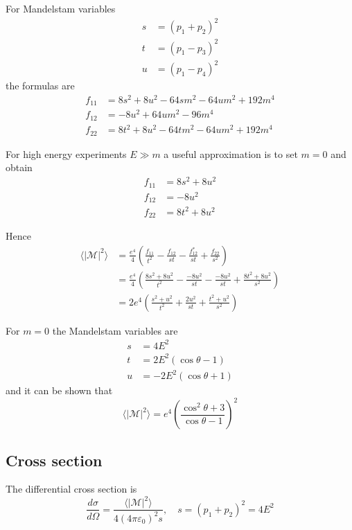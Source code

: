 \documentclass[12pt]{article}
\begin{document}
For Mandelstam variables
\begin{align*}
s&=(p_1+p_2)^2
\\
t&=(p_1-p_3)^2
\\
u&=(p_1-p_4)^2
\end{align*}
the formulas are
\begin{align*}
f_{11} &= 8 s^2 + 8 u^2 - 64 s m^2 - 64 u m^2 + 192 m^4
\\
f_{12} &= -8 u^2 + 64 u m^2 - 96 m^4
\\
f_{22} &= 8 t^2 + 8 u^2 - 64 t m^2 - 64 u m^2 + 192 m^4
\end{align*}

For high energy experiments $E\gg m$ a useful approximation is to set $m=0$ and obtain
\begin{align*}
f_{11}&= 8 s^2 + 8 u^2\\
f_{12}&= -8 u^2\\
f_{22}&= 8 t^2 + 8 u^2
\end{align*}

Hence
\begin{align*}
\langle|\mathcal{M}|^2\rangle
&=\frac{e^4}{4}
\left(
\frac{f_{11}}{t^2} - \frac{f_{12}}{st} -
\frac{f_{12}^*}{st} + \frac{f_{22}}{s^2}
\right)
\\
&=\frac{e^4}{4}
\left(
\frac{8s^2+8u^2}{t^2} - \frac{-8u^2}{st} - \frac{-8u^2}{st} + \frac{8t^2+8u^2}{s^2}
\right)
\\
&=2e^4
\left(
\frac{s^2+u^2}{t^2} + \frac{2u^2}{st} + \frac{t^2+u^2}{s^2}
\right)
\end{align*}

For $m=0$ the Mandelstam variables are
\begin{align*}
s&=4E^2
\\
t&=2E^2(\cos\theta-1)
\\
u&=-2E^2(\cos\theta+1)
\end{align*}
and it can be shown that
\begin{equation*}
\langle|\mathcal{M}|^2\rangle
=e^4
\left(
\frac{\cos^2\theta+3}{\cos\theta-1}
\right)^2
\end{equation*}

\subsection*{Cross section}
The differential cross section is
\begin{equation*}
\frac{d\sigma}{d\Omega}
=\frac{\langle|\mathcal{M}|^2\rangle}{4(4\pi\varepsilon_0)^2s},\quad s=(p_1+p_2)^2=4E^2
\end{equation*}
\end{document}
